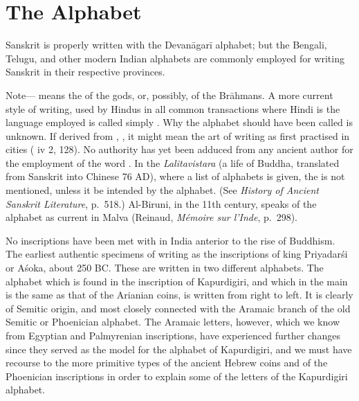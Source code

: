 \def\DevnagVersion{2.17}%
\chapter{The Alphabet}

\s Sanskrit is properly written with the Devanāgarī alphabet; but the
Bengali, Telugu, and other modern Indian alphabets are commonly employed
for writing Sanskrit in their respective provinces.

\begin{note}
  Note— means the  of the gods, or, possibly,
  of the Brāhmans. A more current style of writing, used by Hindus in
  all common transactions where Hindi is the language employed is called
  simply . Why the alphabet should have been called
   is unknown. If derived from , , it
  might mean the art of writing as first practised in cities (\panini{}
  iv 2, 128). No authority has yet been adduced from any ancient author
  for the employment of the word . In the
  \emph{Lalitavistara} (a life of Buddha, translated from Sanskrit into
  Chinese 76 AD), where a list of alphabets is given, the
   is not mentioned, unless it be intended by the
   alphabet. (See \emph{History of Ancient Sanskrit
    Literature}, p.\ 518.) Al-Biruni, in the 11th century, speaks of the
   alphabet as current in Malva (Reinaud, \emph{Mémoire sur
    l'Inde}, p.\ 298).

  No inscriptions have been met with in India anterior to the rise of
  Buddhism. The earliest authentic specimens of writing as the
  inscriptions of king Priyadarśi or Aśoka, about 250 BC. These are
  written in two different alphabets. The alphabet which is found in the
  inscription of Kapurdigiri, and which in the main is the same as that
  of the Arianian coins, is written from right to left. It is clearly of
  Semitic origin, and most closely connected with the Aramaic branch of
  the old Semitic or Phoenician alphabet. The Aramaic letters, however,
  which we know from Egyptian and Palmyrenian inscriptions, have
  experienced further changes since they served as the model for the
  alphabet of Kapurdigiri, and we must have recourse to the more
  primitive types of the ancient Hebrew coins and of the Phoenician
  inscriptions in order to explain some of the letters of the
  Kapurdigiri alphabet.


\end{note}
